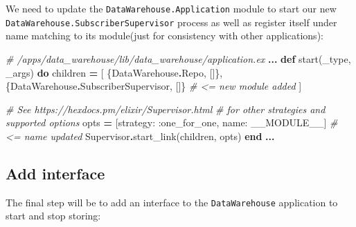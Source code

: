 \documentclass[
  oneside]{book}
\newenvironment{Shaded}{\begin{snugshade}}{\end{snugshade}}
\newcommand{\CommentTok}[1]{\textcolor[rgb]{0.56,0.35,0.01}{\textit{#1}}}
\newcommand{\ConstantTok}[1]{\textcolor[rgb]{0.00,0.00,0.00}{#1}}
\newcommand{\KeywordTok}[1]{\textcolor[rgb]{0.13,0.29,0.53}{\textbf{#1}}}
\newcommand{\NormalTok}[1]{#1}
\newcommand{\OperatorTok}[1]{\textcolor[rgb]{0.81,0.36,0.00}{\textbf{#1}}}
\newcommand{\VariableTok}[1]{\textcolor[rgb]{0.00,0.00,0.00}{#1}}
\begin{document}
We need to update the \texttt{DataWarehouse.Application} module to start our new \texttt{DataWarehouse.SubscriberSupervisor} process as well as register itself under name matching to its module(just for consistency with other applications):

\begin{Shaded}
\begin{Highlighting}[]
  \CommentTok{\# /apps/data\_warehouse/lib/data\_warehouse/application.ex}
  \OperatorTok{...}
  \KeywordTok{def}\NormalTok{ start(\_type, \_args) }\KeywordTok{do}
\NormalTok{    children }\OperatorTok{=}\NormalTok{ [}
\NormalTok{      \{}\ConstantTok{DataWarehouse}\OperatorTok{.}\ConstantTok{Repo}\NormalTok{, []\},}
\NormalTok{      \{}\ConstantTok{DataWarehouse}\OperatorTok{.}\ConstantTok{SubscriberSupervisor}\NormalTok{, []\} }\CommentTok{\# \textless{}= new module added}
\NormalTok{    ]}

    \CommentTok{\# See https://hexdocs.pm/elixir/Supervisor.html}
    \CommentTok{\# for other strategies and supported options}
\NormalTok{    opts }\OperatorTok{=}\NormalTok{ [}\VariableTok{strategy:} \VariableTok{:one\_for\_one}\NormalTok{, }\VariableTok{name:} \ConstantTok{\_\_MODULE\_\_}\NormalTok{] }\CommentTok{\# \textless{}= name updated}
    \ConstantTok{Supervisor}\OperatorTok{.}\NormalTok{start\_link(children, opts)}
  \KeywordTok{end}
  \OperatorTok{...}
\end{Highlighting}
\end{Shaded}

\hypertarget{add-interface}{%
\subsection{Add interface}\label{add-interface}}

The final step will be to add an interface to the \texttt{DataWarehouse} application to start and stop storing:
\end{document}
